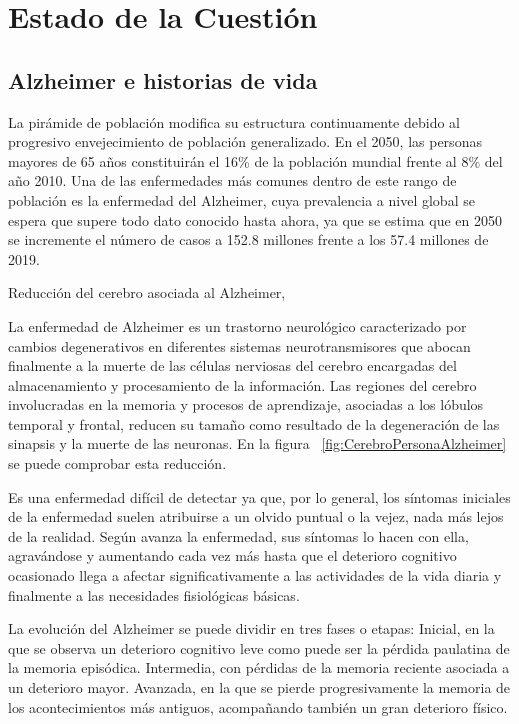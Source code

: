 \chapter{Estado de la Cuestión}
\label{cap:estadoDeLaCuestion}


\section{Alzheimer e historias de vida}
La pirámide de población modifica su estructura continuamente debido al progresivo envejecimiento de población generalizado. En el 2050, las personas mayores de 65 años constituirán el 16\% de la población mundial frente al 8\%  del año 2010. Una de las enfermedades más comunes dentro de este rango de población es la enfermedad del Alzheimer, cuya prevalencia a nivel global se espera que supere todo dato conocido hasta ahora, ya que se estima que en 2050 se incremente el número de casos a 152.8 millones frente a los 57.4 millones de 2019. \citep{estalz}

%
{Reducción del cerebro asociada al Alzheimer, \citet{mattson2004pathways}}

La enfermedad de Alzheimer es un trastorno neurológico caracterizado por cambios degenerativos en diferentes sistemas neurotransmisores que abocan finalmente a la muerte de las células nerviosas del cerebro encargadas del almacenamiento y procesamiento de la información. Las regiones del cerebro involucradas en la memoria y procesos de aprendizaje, asociadas a los lóbulos temporal y frontal, reducen su tamaño como resultado de la degeneración de las sinapsis y la muerte de las neuronas. En la figura ~\ref{fig:CerebroPersonaAlzheimer} se puede comprobar esta reducción.

Es una enfermedad difícil de detectar ya que, por lo general, los síntomas iniciales de la enfermedad suelen atribuirse a un olvido puntual o la vejez, nada más lejos de la realidad. Según avanza la enfermedad, sus síntomas lo hacen con ella, agravándose y aumentando cada vez más hasta que el deterioro cognitivo ocasionado llega a afectar significativamente a las actividades de la vida diaria y finalmente a las necesidades fisiológicas básicas.

La evolución del Alzheimer se puede dividir en tres fases o etapas: Inicial, en la que se observa un deterioro cognitivo leve como puede ser la pérdida paulatina de la memoria episódica. Intermedia, con pérdidas de la memoria reciente asociada a un deterioro mayor. Avanzada, en la que se pierde progresivamente la memoria de los acontecimientos más antiguos, acompañando también un gran deterioro físico.

